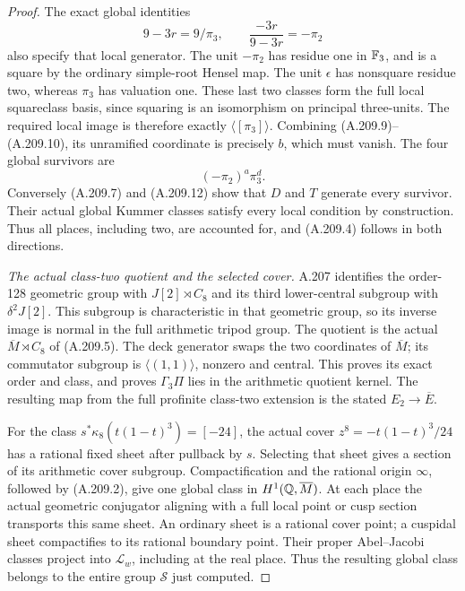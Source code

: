 \begin{proof}
The exact global identities
\[
              9-3r=9/\pi_3,\qquad
              \frac{-3r}{9-3r}=-\pi_2
\tag{A.209.12}
\]
also specify that local generator.
The unit \(-\pi_2\) has residue one in \(\mathbb F_3\),
and is a square by the ordinary simple-root Hensel map.
The unit \(\epsilon\) has nonsquare residue two,
whereas \(\pi_3\) has valuation one.
These last two classes form the full local squareclass
basis, since squaring is an isomorphism on principal
three-units.  The required local image is therefore
exactly \(\langle[\pi_3]\rangle\).
Combining (A.209.9)--(A.209.10), its unramified coordinate
is precisely \(b\), which must vanish.  The four global
survivors are
\[
                         (-\pi_2)^a\pi_3^d.
\tag{A.209.13}
\]
Conversely (A.209.7) and (A.209.12) show that \(D\)
and \(T\) generate every survivor.  Their actual global
Kummer classes satisfy every local condition by construction.
Thus all places, including two, are accounted for, and
(A.209.4) follows in both directions.

\emph{The actual class-two quotient and the selected cover.}
A.207 identifies the order-128 geometric group with
\(J[2]\rtimes C_8\) and its third lower-central
subgroup with \(\delta^2J[2]\).
This subgroup is characteristic in that geometric group,
so its inverse image is normal in the full arithmetic
tripod group.  The quotient is the actual
\(\overline M\rtimes C_8\) of (A.209.5).
The deck generator swaps the two coordinates of
\(\overline M\); its commutator subgroup is
\(\langle(1,1)\rangle\), nonzero and central.
This proves its exact order and class, and proves
\(\Gamma_3\Pi\) lies in the arithmetic quotient kernel.
The resulting map from the full profinite class-two
extension is the stated \(E_2\to\overline E\).

For the class \(s^*\kappa_8(t(1-t)^3)=[-24]\),
the actual cover \(z^8=-t(1-t)^3/24\) has a rational
fixed sheet after pullback by \(s\).
Selecting that sheet gives a section of its arithmetic
cover subgroup.  Compactification and the rational
origin \(\infty\), followed by (A.209.2), give
one global class in \(H^1(\mathbb Q,\overline M)\).
At each place the actual geometric conjugator aligning
with a full local point or cusp section transports this
same sheet.  An ordinary sheet is a rational cover point;
a cuspidal sheet compactifies to its rational boundary
point.  Their proper Abel--Jacobi classes project into
\(\mathcal L_w\), including at the real place.
Thus the resulting global class belongs to the entire
group \(\mathcal S\) just computed.


\end{proof}
